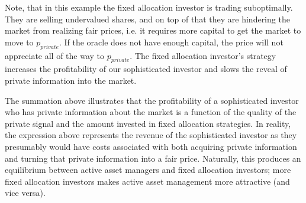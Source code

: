 \documentclass[12pt]{article}
\begin{document}
\par Note, that in this example the fixed allocation investor is trading suboptimally. They are selling undervalued shares, and on top of that they are hindering the market from realizing fair prices, i.e. it requires more capital to get the market to move to $p_{private}$. If the oracle does not have enough capital, the price will not appreciate all of the way to $p_{private}$. The fixed allocation investor's strategy increases the profitability of our sophisticated investor and slows the reveal of private information into the market.
\par The summation above illustrates that the profitability of a sophisticated investor who has private information about the market is a function of the quality of the private signal and the amount invested in fixed allocation strategies. In reality, the expression above represents the revenue of the sophisticated investor as they presumably would have costs associated with both acquiring private information and turning that private information into a fair price. Naturally, this produces an equilibrium between active asset managers and fixed allocation investors; more fixed allocation investors makes active asset management more attractive (and vice versa).
\end{document}
